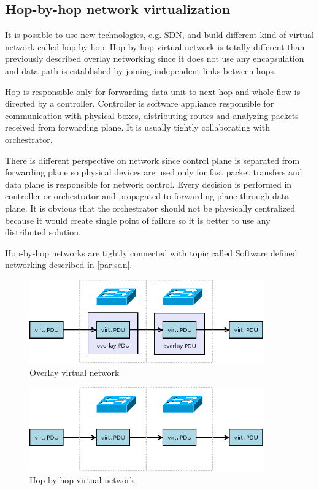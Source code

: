 \subsection{Hop-by-hop network virtualization}
It is possible to use new technologies, e.g. \Ac{SDN}, and build different kind of virtual network called hop-by-hop. Hop-by-hop virtual network is totally different than previously described overlay networking since it does not use any encapsulation and data path is established by joining independent links between hops.

Hop is responsible only for forwarding data unit to next hop and whole flow is directed by a controller. Controller is software appliance responsible for communication with physical boxes, distributing routes and analyzing packets received from forwarding plane. It is usually tightly collaborating with orchestrator.

There is different perspective on network since control plane is separated from forwarding plane so physical devices are used only for fast packet transfers and data plane is responsible for network control. Every decision is performed in controller or orchestrator and propagated to forwarding plane through data plane. It is obvious that the orchestrator should not be physically centralized because it would create single point of failure so it is better to use any distributed solution.

Hop-by-hop networks are tightly connected with topic called Software defined networking described in \ref{par:sdn}.

\begin{figure}[htb]
	\begin{center}
	\includegraphics[width=0.9\textwidth]{overlay.png}
	\end{center}
	\caption{Overlay virtual network}
	\label{img:overlay}
\end{figure}


\begin{figure}[htb]
	\begin{center}
	\includegraphics[width=0.9\textwidth]{hop-by-hop.png}
	\end{center}
	\caption{Hop-by-hop virtual network}
	\label{img:hop-by-hop}
\end{figure}


